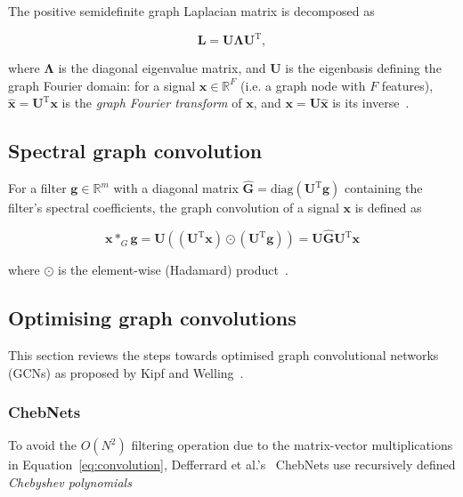 The positive semidefinite graph Laplacian matrix is decomposed as

\begin{equation}
    \mathbf{L} = \mathbf{U\Lambda U}^\mathrm{T},
\end{equation}

where $\mathbf{\Lambda}$ is the diagonal eigenvalue matrix, and $\mathbf{U}$ is the eigenbasis defining the graph Fourier domain: for a signal $\mathbf{x} \in \mathbb{R}^{F}$ (i.e. a graph node with $F$ features), $\mathbf{\hat{x}} = \mathbf{U}^\mathrm{T}\mathbf{x}$ is the \textit{graph Fourier transform} of $\mathbf{x}$, and $\mathbf{x} = \mathbf{U}\mathbf{\hat{x}}$ is its inverse~\cite{wu2019simplifying}.



\subsection{Spectral graph convolution}

For a filter $\mathbf{g} \in \mathbb{R}^m$ with a diagonal matrix $\mathbf{\hat{G}} = \mathrm{diag}(\mathbf{U}^\mathrm{T}\mathbf{g})$ containing the filter's spectral coefficients, the graph convolution of a signal $\mathbf{x}$ is defined as

\begin{equation}
    \label{eq:convolution}
    \mathbf{x} *_G \mathbf{g} = \mathbf{U}((\mathbf{U}^\mathrm{T}\mathbf{x}) \odot (\mathbf{U}^\mathrm{T}\mathbf{g})) = \mathbf{U}\mathbf{\hat{G}}\mathbf{U}^\mathrm{T}\mathbf{x}
\end{equation}

where $\odot$ is the element-wise (Hadamard) product~\cite{wu2019simplifying}.

\subsection{Optimising graph convolutions}
This section reviews the steps towards optimised graph convolutional networks (GCNs) as proposed by Kipf and Welling~\cite{kipf2017semi}.

\subsubsection{ChebNets}
To avoid the $O(N^2)$ filtering operation due to the matrix-vector multiplications in Equation~\eqref{eq:convolution}, Defferrard et al.'s~\cite{defferrard2016convolutional} ChebNets use recursively defined \textit{Chebyshev polynomials}

